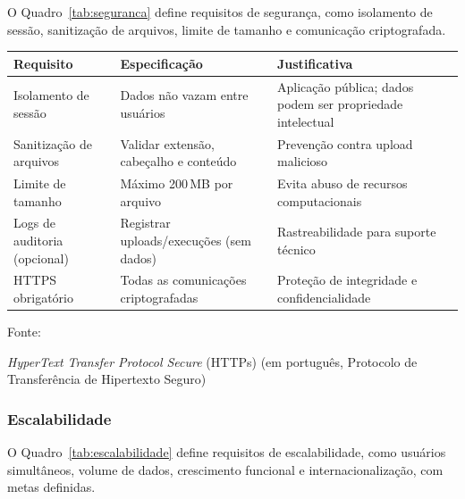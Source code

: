 O Quadro~\ref{tab:seguranca} define requisitos de segurança, como isolamento de sessão, sanitização de arquivos, limite de tamanho e comunicação criptografada.

\begin{quadro}[ht]
\begin{center}
\small
\captionsetup{justification=centering, labelsep=endash, width=0.75\linewidth}
\caption{Requisitos de segurança do sistema.}
\label{tab:seguranca}
\begin{threeparttable}
\begin{tabularx}{\textwidth}{|l|X|X|} \hline
\textbf{Requisito} & \textbf{Especificação} & \textbf{Justificativa} \\ \hline
Isolamento de sessão & Dados não vazam entre usuários & Aplicação pública; dados podem ser propriedade intelectual \\ \hline
Sanitização de arquivos & Validar extensão, cabeçalho e conteúdo & Prevenção contra upload malicioso \\ \hline
Limite de tamanho & Máximo 200\,MB por arquivo & Evita abuso de recursos computacionais \\ \hline
Logs de auditoria (opcional) & Registrar uploads/execuções (sem dados) & Rastreabilidade para suporte técnico \\ \hline
HTTPS\tnote{a} obrigatório & Todas as comunicações criptografadas & Proteção de integridade e confidencialidade \\ \hline
\end{tabularx}
\begin{tablenotes}[flushleft]
\footnotesize
\item Fonte:~\oautor
\item[a] \textit{HyperText Transfer Protocol Secure} (HTTPs) (em português, Protocolo de Transferência de Hipertexto Seguro)
\end{tablenotes}
\end{threeparttable}
\end{center}
\end{quadro}



\subsubsection{Escalabilidade}
\label{ssubsec:escalabilidade}

O Quadro~\ref{tab:escalabilidade} define requisitos de escalabilidade, como usuários simultâneos, volume de dados, crescimento funcional e internacionalização, com metas definidas.

